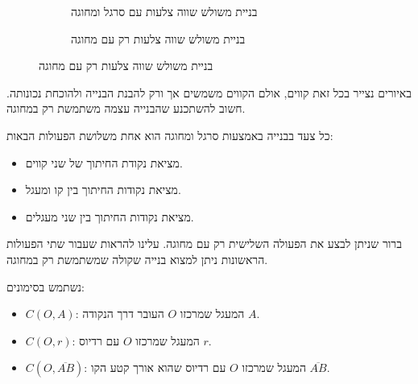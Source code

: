 \begin{figure}[htb]
\begin{center}
\begin{subfigure}{.4\textwidth}
\caption{בניית משולש שווה צלעות עם סרגל ומחוגה}\label{f.compass-equi}
\end{subfigure}
\hspace{3em}
\begin{subfigure}{.4\textwidth}
\caption{בניית משולש שווה צלעות רק עם מחוגה}\label{f.compass-equi-only}
\end{subfigure}
\end{center}
\end{figure}
באיורים נצייר בכל זאת קווים, אולם הקווים משמשים אך ורק להבנת הבנייה ולהוכחת נכונותה. חשוב להשתכנע שהבנייה עצמה משתמשת רק במחוגה.


כל צעד בבנייה באמצעות סרגל ומחוגה הוא אחת משלושת הפעולות הבאות:
\begin{itemize}
\item
מציאת נקודת החיתוך של שני קווים.
\item
מציאת נקודות החיתוך בין קו ומעגל.
\item
מציאת נקודות החיתוך בין שני מעגלים.
\end{itemize}
ברור שניתן לבצע את הפעולה השלישית רק עם מחוגה. עלינו להראות שעבור שתי הפעולות הראשונות ניתן למצוא בנייה שקולה שמשתמשת רק במחוגה.


נשתמש בסימונים:
\begin{itemize}
\item $C(O,A)$: 
המעגל שמרכזו
$O$
העובר דרך הנקודה
$A$.
\item $C(O,r)$:
המעגל שמרכזו
$O$
עם רדיוס
$r$.
\item $C(O,\overline{AB})$:
המעגל שמרכזו
$O$
עם רדיוס שהוא אורך קטע הקו
$\overline{AB}$.
\end{itemize}

